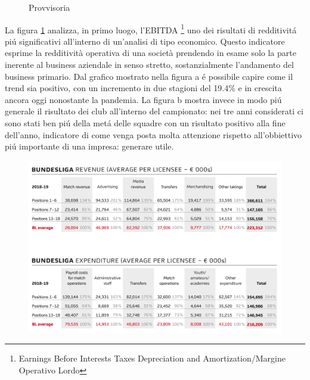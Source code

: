 \documentclass[
    corpo=11.5pt,
    oneside,
    evenboxes,
    tipotesi=triennale,
    stile=classica,
    oldstyle,
    autoretitolo,
    greek,
]{toptesi}
\begin{document}
\begin{interlinea}{1.5}
\begin{figure}
    \centering
     \quad
    \caption{Provvisoria}
    \label{bundes}  
\end{figure}
La figura \ref{bundes} analizza, in primo luogo, l'EBITDA \footnote{Earnings Before Interests Taxes Depreciation and Amortization/Margine Operativo Lordo}
uno dei risultati di redditivit\'a pi\'u significativi all'interno di un'analisi di tipo economico. Questo indicatore 
esprime la redditività operativa di una società prendendo in esame solo la parte inerente al business aziendale in senso stretto, 
sostanzialmente l'andamento del business primario. Dal grafico mostrato nella figura a \'e possibile capire come il trend sia positivo,
con un incremento in due stagioni del 19.4\% e in crescita ancora oggi nonostante la pandemia. La figura b mostra invece in modo pi\'u
generale il risultato dei club all'interno del campionato: nei tre anni considerati ci sono stati ben pi\'u della met\'a delle squadre
con un risultato positivo alla fine dell'anno, indicatore di come venga posta molta attenzione rispetto all'obbiettivo pi\'u importante
di una impresa: generare utile.\\
\begin{figure}
    \centering
    \includegraphics[scale=0.5]{img/bunde_spese_ricavi_club.png}

\end{figure}
\end{interlinea}
\end{document}
